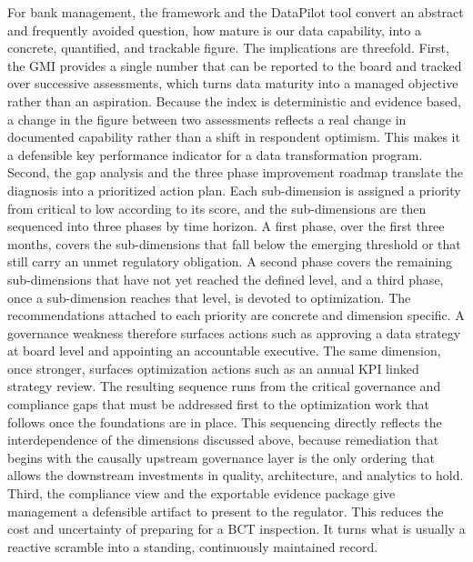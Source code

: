 For bank management, the framework and the DataPilot tool convert an abstract and frequently avoided question, how mature is our data capability, into a concrete, quantified, and trackable figure. The implications are threefold. First, the GMI provides a single number that can be reported to the board and tracked over successive assessments, which turns data maturity into a managed objective rather than an aspiration. Because the index is deterministic and evidence based, a change in the figure between two assessments reflects a real change in documented capability rather than a shift in respondent optimism. This makes it a defensible key performance indicator for a data transformation program. Second, the gap analysis and the three phase improvement roadmap translate the diagnosis into a prioritized action plan. Each sub-dimension is assigned a priority from critical to low according to its score, and the sub-dimensions are then sequenced into three phases by time horizon. A first phase, over the first three months, covers the sub-dimensions that fall below the emerging threshold or that still carry an unmet regulatory obligation. A second phase covers the remaining sub-dimensions that have not yet reached the defined level, and a third phase, once a sub-dimension reaches that level, is devoted to optimization. The recommendations attached to each priority are concrete and dimension specific. A governance weakness therefore surfaces actions such as approving a data strategy at board level and appointing an accountable executive. The same dimension, once stronger, surfaces optimization actions such as an annual KPI linked strategy review. The resulting sequence runs from the critical governance and compliance gaps that must be addressed first to the optimization work that follows once the foundations are in place. This sequencing directly reflects the interdependence of the dimensions discussed above, because remediation that begins with the causally upstream governance layer is the only ordering that allows the downstream investments in quality, architecture, and analytics to hold. Third, the compliance view and the exportable evidence package give management a defensible artifact to present to the regulator. This reduces the cost and uncertainty of preparing for a BCT inspection. It turns what is usually a reactive scramble into a standing, continuously maintained record.

